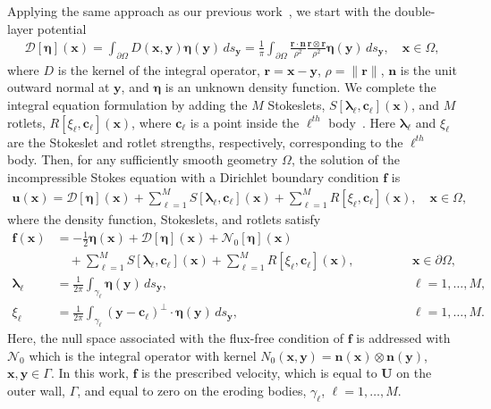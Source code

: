 \documentclass[3p]{elsarticle}
\newcommand{\bd}{{\partial}}
\newcommand{\cc}{{\mathbf{c}}}
\newcommand{\DDD}{{\boldsymbol{\mathcal D}}}
\newcommand{\eeta}{{\boldsymbol\eta}}
\newcommand{\ff}{{\mathbf{f}}}
\newcommand{\llambda}{{\boldsymbol\lambda}}
\newcommand{\nn}{{\mathbf{n}}}
\newcommand{\NN}{{\mathcal{N}}}
\newcommand{\rr}{{\mathbf{r}}}
\newcommand{\uu}{{\mathbf{u}}}
\newcommand{\UU}{{\mathbf{U}}}
\newcommand{\xx}{{\mathbf{x}}}
\newcommand{\yy}{{\mathbf{y}}}
\begin{document}
Applying the same approach as our previous work~\citep{qua-moo2018}, we
start with the double-layer potential 
\begin{align}
  \DDD[\eeta](\xx) = \int_{\bd\Omega} D(\xx,\yy) \eeta(\yy)\, ds_\yy = 
  \frac{1}{\pi}\int_{\bd\Omega} 
    \frac{\rr \cdot \nn}{\rho^2} \frac{\rr \otimes \rr}{\rho^2}
    \eeta(\yy) \, ds_\yy, \quad \xx \in \Omega,
  \label{eqn:velocityDLP}
\end{align}
where $D$ is the kernel of the integral operator, $\rr = \xx - \yy$,
$\rho = \|\rr\|$, $\nn$ is the unit outward normal at $\yy$, and $\eeta$
is an unknown density function.  We complete the integral equation
formulation by adding the $M$ Stokeslets,
$S[\llambda_\ell,\cc_\ell](\xx)$, and $M$ rotlets,
$R[\xi_\ell,\cc_\ell](\xx)$, where $\cc_\ell$ is a point inside the
$\ell^{th}$ body~\citep{pow-mir1987}.  Here $\llambda_\ell$ and
$\xi_\ell$ are the Stokeslet and rotlet strengths, respectively,
corresponding to the $\ell^{th}$ body.  Then, for any sufficiently
smooth geometry $\Omega$, the solution of the incompressible Stokes
equation with a Dirichlet boundary condition $\ff$ is
\begin{align}
  \uu(\xx) = \DDD[\eeta](\xx) + 
    \sum_{\ell=1}^M S[\llambda_\ell,\cc_\ell](\xx) + 
    \sum_{\ell=1}^M R[\xi_\ell,\cc_\ell](\xx), \quad \xx \in \Omega,
\end{align}
where the density function, Stokeslets, and rotlets satisfy
\begin{subequations}
\label{eqn:BIE}
\begin{alignat}{3}
  \ff(\xx) &= -\frac{1}{2}\eeta(\xx) + \DDD[\eeta](\xx) + 
    \NN_0[\eeta](\xx) \nonumber \\
    &\quad + \sum_{\ell=1}^M S[\llambda_\ell,\cc_\ell](\xx) + 
    \sum_{\ell=1}^M R[\xi_\ell,\cc_\ell](\xx), 
    \quad &&\qquad\xx \in \bd\Omega, \\
  \llambda_\ell &= \frac{1}{2\pi} \int_{\gamma_\ell} 
    \eeta(\yy)\, ds_\yy, &&\qquad \ell = 1,\ldots,M, \\
  \xi_\ell &= \frac{1}{2\pi} \int_{\gamma_\ell}
    (\yy - \cc_\ell)^\perp \cdot \eeta(\yy)\, ds_\yy, 
    &&\qquad \ell = 1,\ldots,M.
\end{alignat}
\end{subequations}
Here, the null space associated with the flux-free condition of $\ff$ is
addressed with  $\NN_0$ which is the integral operator with kernel
$N_0(\xx,\yy) = \nn(\xx) \otimes \nn(\yy)$, $\xx,\yy \in \Gamma$.  In
this work, $\ff$ is the prescribed velocity, which is equal to $\UU$ on
the outer wall, $\Gamma$, and equal to zero on the eroding bodies,
$\gamma_\ell$, $\ell=1,\ldots,M$.
\end{document}
